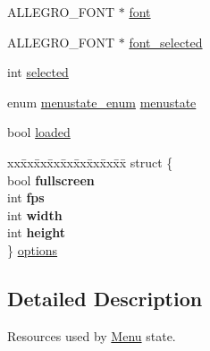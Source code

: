 \begin{DoxyCompactItemize}
\item 
A\-L\-L\-E\-G\-R\-O\-\_\-\-F\-O\-N\-T $\ast$ \hyperlink{structMenu_aa4e0229cb315ef9e0ea90263b26a37f8}{font}
\item 
A\-L\-L\-E\-G\-R\-O\-\_\-\-F\-O\-N\-T $\ast$ \hyperlink{structMenu_a577ad17dfddafaae41dde63ca7970003}{font\-\_\-selected}
\item 
int \hyperlink{structMenu_a608e2768a5458057048bf1c7ab9a81aa}{selected}
\item 
enum \hyperlink{main_8h_a5b988954c565e5ff444d61085e367fae}{menustate\-\_\-enum} \hyperlink{structMenu_a6c264952ac073cf2f290de86a677c876}{menustate}
\item 
bool \hyperlink{structMenu_afd245b822f2805677609fc0f78ee59ac}{loaded}
\item 
\begin{tabbing}
xx\=xx\=xx\=xx\=xx\=xx\=xx\=xx\=xx\=\kill
struct \{\\
\>bool {\bfseries fullscreen}\\
\>int {\bfseries fps}\\
\>int {\bfseries width}\\
\>int {\bfseries height}\\
\} \hyperlink{structMenu_a6ee9749efa96939d50728015a3fd6609}{options}\\

\end{tabbing}\end{DoxyCompactItemize}


\subsection{Detailed Description}
Resources used by \hyperlink{structMenu}{Menu} state. 

